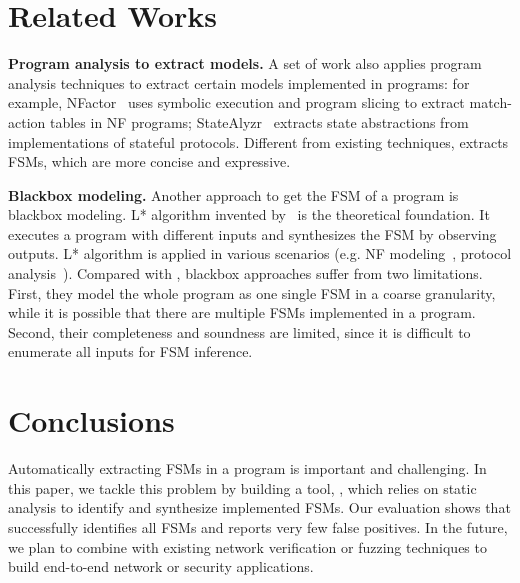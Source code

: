 \section{Related Works}
\label{sec:related}

\noindent\textbf{Program analysis to extract models.}
A set of work also applies program analysis techniques
to extract certain models implemented in programs:
for example, NFactor~\cite{wu2016automatic}
uses symbolic execution and program slicing to extract match-action
tables in NF programs;
StateAlyzr~\cite{khalid2016paving} extracts state abstractions
from implementations of stateful protocols.
Different from existing techniques, \Tool{} extracts FSMs,
which are more concise and expressive.

\noindent\textbf{Blackbox modeling.}
Another approach to get the FSM of a program is blackbox modeling.
L* algorithm invented by~\citet{angluin1987learning}
is the theoretical foundation.
It executes a program with different inputs and
synthesizes the FSM by observing outputs.
L* algorithm is applied in various scenarios
(e.g. NF modeling~\cite{moon2019alembic},
protocol analysis~\cite{cho2011mace}).
Compared with \Tool{}, blackbox approaches suffer from two limitations.
First, they model the whole program as one single FSM in a coarse granularity,
while it is possible that there are multiple FSMs implemented in a program.
Second, their completeness and soundness are limited,
since it is difficult to enumerate all inputs for
FSM inference.



\section{Conclusions}

Automatically extracting FSMs in a program is important
and challenging.
In this paper, we tackle this problem by building a tool, \Tool{},
which relies on static analysis to identify and synthesize implemented FSMs.
Our evaluation shows that \Tool{} successfully identifies all FSMs and
reports very few false positives.
In the future, we plan to combine \Tool{} with existing network verification
or fuzzing techniques to build end-to-end network or security applications.







